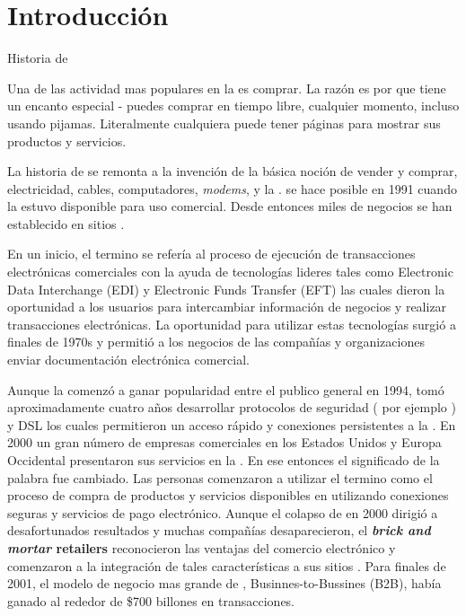 \chapter{Introducción}\label{cap:intro}

Historia de \ecommerce

Una de las actividad mas populares en la \web es comprar. La razón es por que tiene un encanto especial - puedes comprar en tiempo libre, cualquier momento, incluso usando pijamas. Literalmente cualquiera puede tener páginas para mostrar sus productos y servicios.

La historia de \ecommerce se remonta a la invención de la básica noción de \“vender y comprar\”, electricidad, cables, computadores, \textit{modems}, y la \internet. \ecommerce se hace posible en 1991 cuando la \internet estuvo disponible para uso comercial. Desde entonces miles de negocios se han establecido en sitios \web.

En un inicio, el termino \ecommerce se refería al proceso de ejecución  de transacciones electrónicas comerciales con la ayuda de tecnologías lideres tales como Electronic Data Interchange (EDI) y Electronic Funds Transfer (EFT) las cuales dieron la oportunidad a los usuarios para intercambiar información de negocios y realizar transacciones electrónicas. La oportunidad para utilizar estas tecnologías surgió a finales de 1970s y permitió a los negocios de las compañías y organizaciones enviar documentación electrónica comercial.

Aunque la \internet comenzó a ganar popularidad  entre el publico general en 1994, tomó aproximadamente cuatro años desarrollar protocolos de seguridad ( por ejemplo \http) y DSL los cuales permitieron un acceso rápido y conexiones persistentes a la \internet. En 2000 un gran número de empresas comerciales en los Estados Unidos y Europa Occidental presentaron sus servicios en la \www. En ese entonces el significado de la palabra \ecommerce fue cambiado. Las personas comenzaron a utilizar el termino \ecommerce como el proceso de compra de productos y servicios disponibles en \internet utilizando conexiones seguras y servicios de pago electrónico. Aunque el colapso de \dotcom en 2000 dirigió a desafortunados resultados y muchas compañías \ecommerce desaparecieron, el \textbf{\textit{brick and mortar} retailers} reconocieron las ventajas del comercio electrónico y comenzaron a la integración de tales características a sus sitios \web. Para finales de 2001, el modelo de negocio mas grande de \ecommerce, Businnes-to-Bussines (B2B), había ganado al rededor de \$700 billones en transacciones.

